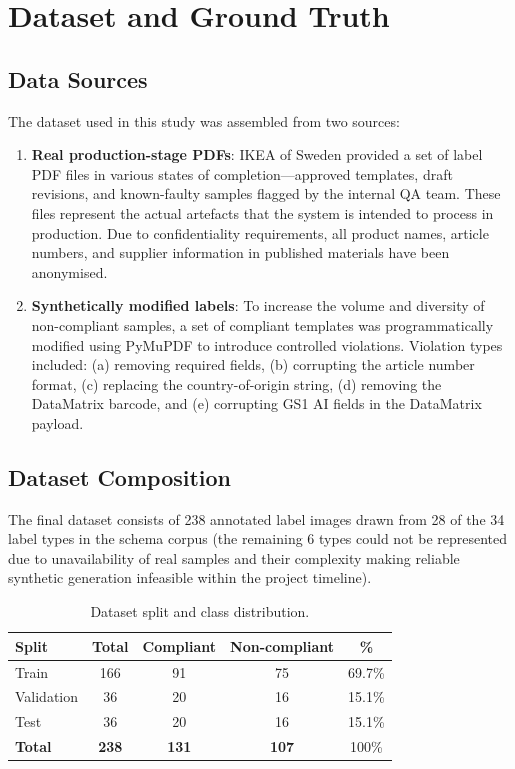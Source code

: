 \chapter{Dataset and Ground Truth}
\label{ch:dataset}

\section{Data Sources}

The dataset used in this study was assembled from two sources:

\begin{enumerate}
  \item \textbf{Real production-stage PDFs}: IKEA of Sweden provided a set of label PDF
  files in various states of completion—approved templates, draft revisions, and known-faulty
  samples flagged by the internal \ac{QA} team. These files represent the actual artefacts
  that the system is intended to process in production. Due to confidentiality requirements,
  all product names, article numbers, and supplier information in published materials have
  been anonymised.

  \item \textbf{Synthetically modified labels}: To increase the volume and diversity of
  non-compliant samples, a set of compliant templates was programmatically modified using
  PyMuPDF to introduce controlled violations. Violation types included: (a) removing
  required fields, (b) corrupting the article number format, (c) replacing the country-of-origin
  string, (d) removing the DataMatrix barcode, and (e) corrupting GS1 AI fields in the
  DataMatrix payload.
\end{enumerate}

\section{Dataset Composition}

The final dataset consists of 238 annotated label images drawn from 28 of the 34 label
types in the schema corpus (the remaining 6 types could not be represented due to
unavailability of real samples and their complexity making reliable synthetic generation
infeasible within the project timeline).

\begin{table}[h]
\centering
\caption{Dataset split and class distribution.}
\label{tab:dataset_split}
\begin{tabular}{lcccc}
\toprule
\textbf{Split} & \textbf{Total} & \textbf{Compliant} & \textbf{Non-compliant} & \textbf{\%} \\
\midrule
Train       & 166 & 91  & 75  & 69.7\% \\
Validation  & 36  & 20  & 16  & 15.1\% \\
Test        & 36  & 20  & 16  & 15.1\% \\
\midrule
\textbf{Total} & \textbf{238} & \textbf{131} & \textbf{107} & 100\% \\
\bottomrule
\end{tabular}
\end{table}

